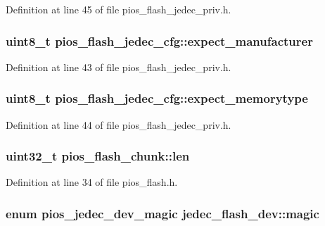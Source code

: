 \-Definition at line 45 of file pios\-\_\-flash\-\_\-jedec\-\_\-priv.\-h.

\hypertarget{group___p_i_o_s___f_l_a_s_h_gab7416f66a2c392cc5a27e12cbf4e9a07}{
\subsubsection[{expect\-\_\-manufacturer}]{\setlength{\rightskip}{0pt plus 5cm}uint8\-\_\-t {\bf pios\-\_\-flash\-\_\-jedec\-\_\-cfg\-::expect\-\_\-manufacturer}}}\label{group___p_i_o_s___f_l_a_s_h_gab7416f66a2c392cc5a27e12cbf4e9a07}


\-Definition at line 43 of file pios\-\_\-flash\-\_\-jedec\-\_\-priv.\-h.

\hypertarget{group___p_i_o_s___f_l_a_s_h_gacfb5714f6cef5d14a78a38ebe2369b43}{
\subsubsection[{expect\-\_\-memorytype}]{\setlength{\rightskip}{0pt plus 5cm}uint8\-\_\-t {\bf pios\-\_\-flash\-\_\-jedec\-\_\-cfg\-::expect\-\_\-memorytype}}}\label{group___p_i_o_s___f_l_a_s_h_gacfb5714f6cef5d14a78a38ebe2369b43}


\-Definition at line 44 of file pios\-\_\-flash\-\_\-jedec\-\_\-priv.\-h.

\hypertarget{group___p_i_o_s___f_l_a_s_h_ga127467a644fb34d50d9c074535dcaec3}{
\subsubsection[{len}]{\setlength{\rightskip}{0pt plus 5cm}uint32\-\_\-t {\bf pios\-\_\-flash\-\_\-chunk\-::len}}}\label{group___p_i_o_s___f_l_a_s_h_ga127467a644fb34d50d9c074535dcaec3}


\-Definition at line 34 of file pios\-\_\-flash.\-h.

\hypertarget{group___p_i_o_s___f_l_a_s_h_gaf71b8f686812a43a77983b3ec807aed7}{
\subsubsection[{magic}]{\setlength{\rightskip}{0pt plus 5cm}enum {\bf pios\-\_\-jedec\-\_\-dev\-\_\-magic} {\bf jedec\-\_\-flash\-\_\-dev\-::magic}}}\label{group___p_i_o_s___f_l_a_s_h_gaf71b8f686812a43a77983b3ec807aed7}


